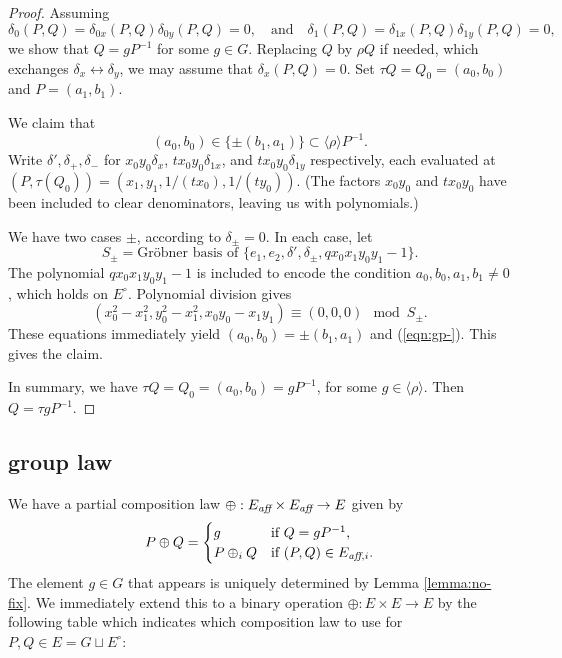 \documentclass[12pt]{article}
\newcommand{\op}[1]{\hbox{#1}}
\newcommand{\Eaff}{E_{\op{\scriptsize\it aff}}}
\newcommand{\Eaf}[1]{E_{\op{\scriptsize\it aff},{#1}}}
\newcommand{\Eoo}{E^{\circ}}
\newcommand{\Go}{\langle\rho\rangle}
\def\cong{\equiv}
\begin{document}
\begin{proof} 
  Assuming
  \[
  \delta_0(P,Q) = \delta_{0x}(P,Q)\delta_{0y}(P,Q)=0,\quad\text{and}\quad
  \delta_1(P,Q) = \delta_{1x}(P,Q)\delta_{1y}(P,Q)=0,
  \]
  we show that $Q = g P^{-1}$ for some $g\in G$.
  Replacing $Q$ by $\rho Q$ if needed, which exchanges
  $\delta_x\leftrightarrow \delta_y$, we may assume that
  $\delta_x(P,Q)=0$.  Set $\tau Q = Q_0 = (a_0,b_0)$ and
  $P=(a_1,b_1)$.  

We claim that
\begin{equation}\label{eqn:gp-}
(a_0,b_0) \in \{\pm (b_1,a_1)\} \subset \Go P^{-1}.
\end{equation}
Write $\delta',\delta_{+},\delta_{-}$ for $x_0 y_0\delta_x$,
$t x_0 y_0\delta_{1x}$, and $t x_0 y_0 \delta_{1y}$ respectively,
each evaluated at $(P,\tau(Q_0))=(x_1,y_1,1/(t x_0),1/(t y_0))$. 
(The factors $x_0y_0$
and $t x_0 y_0$ have been included to clear denominators, leaving us
with polynomials.)

We have two cases $\pm$, according to $\delta_{\pm}=0$.
In each case, let
\[
S_\pm = \text{Gr\"obner basis of } \{e_1,e_2, 
\delta',\delta_{\pm},q x_0 x_1 y_0 y_1 - 1\}.
\]
The polynomial $q x_0 x_1 y_0 y_1-1$ is included to encode the
condition $a_0,b_0,a_1,b_1\ne 0$, which holds on $\Eoo$.  Polynomial
division gives
\begin{equation}\label{eqn:dichot}
(x_0^2-x_1^2,y_0^2-x_1^2,x_0 y_0 - x_1 y_1) \cong (0,0,0) \mod S_\pm.
\end{equation}
These equations immediately yield $(a_0,b_0) = \pm (b_1,a_1)$ and
(\ref{eqn:gp-}).  This gives the claim.


In summary, we have $\tau Q = Q_0 = (a_0,b_0) = g P^{-1}$, for some
$g\in \Go$.  Then $Q = \tau g P^{-1}$.
\end{proof}

\subsection{group law}

We have a partial composition law 
$\oplus:\Eaff\times\Eaff\to E$ given by
\begin{equation}\label{eqn:dicho}
P\oplus Q = \begin{cases}
g & \text{if } Q = g P^{-1},\\
P\oplus_i Q & \text{if } (P,Q)\in \Eaf{i}.
\end{cases}
\end{equation}
The element $g\in G$ that appears is uniquely determined by Lemma
\ref{lemma:no-fix}.  
We immediately extend this to a binary operation $\oplus:E\times E\to
E$ by the following table which indicates which composition law to use for
$P,Q\in E= G\sqcup \Eoo$:
\end{document}
